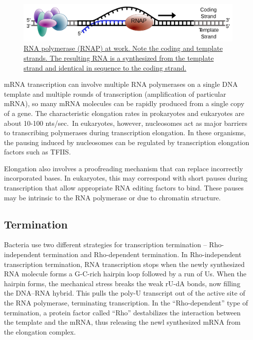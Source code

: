 \begin{figure}

{\centering \includegraphics[width=0.7\linewidth]{./figures/transcription/Simple_transcription_elongation1} 

}

\caption{\href{https://commons.wikimedia.org/wiki/File:Simple_transcription_elongation1.svg}{RNA polymerase (RNAP) at work. Note the coding and template strands. The resulting RNA is a synthesized from the template strand and identical in sequence to the coding strand.}}\label{fig:elongation}
\end{figure}

mRNA transcription can involve multiple RNA polymerases on a single DNA template and multiple rounds of transcription (amplification of particular mRNA), so many mRNA molecules can be rapidly produced from a single copy of a gene. The characteristic elongation rates in prokaryotes and eukaryotes are about 10-100 nts/sec.~In eukaryotes, however, nucleosomes act as major barriers to transcribing polymerases during transcription elongation. In these organisms, the pausing induced by nucleosomes can be regulated by transcription elongation factors such as TFIIS.

Elongation also involves a proofreading mechanism that can replace incorrectly incorporated bases. In eukaryotes, this may correspond with short pauses during transcription that allow appropriate RNA editing factors to bind. These pauses may be intrinsic to the RNA polymerase or due to chromatin structure.

\hypertarget{termination-1}{%
\subsection{Termination}\label{termination-1}}

Bacteria use two different strategies for transcription termination -- Rho-independent termination and Rho-dependent termination. In Rho-independent transcription termination, RNA transcription stops when the newly synthesized RNA molecule forms a G-C-rich hairpin loop followed by a run of Us. When the hairpin forms, the mechanical stress breaks the weak rU-dA bonds, now filling the DNA--RNA hybrid. This pulls the poly-U transcript out of the active site of the RNA polymerase, terminating transcription. In the ``Rho-dependent'' type of termination, a protein factor called ``Rho'' destabilizes the interaction between the template and the mRNA, thus releasing the newl synthesized mRNA from the elongation complex.

